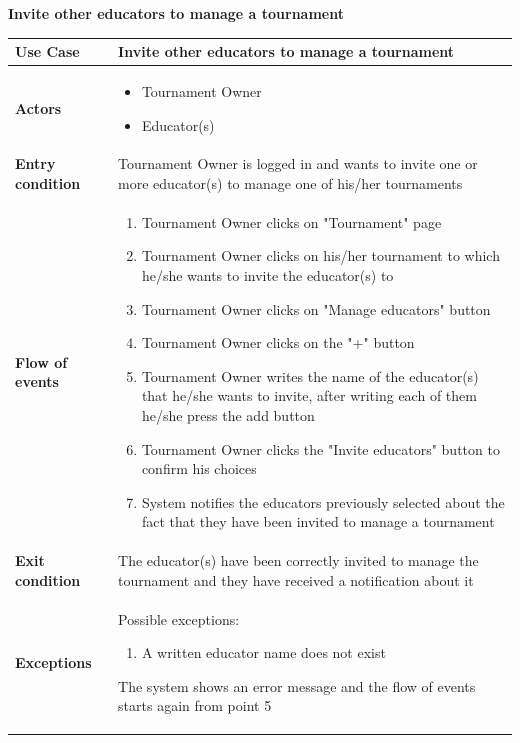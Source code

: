 \documentclass[../RASD.tex]{subfiles}
\begin{document}
        \textbf{Invite other educators to manage a tournament}\\
        \begin{table}[h!]
            \begin{center}
                \begin{tabular}{|m{10em}|m{30em}|}
                \hline
                \textbf{Use Case} & Invite other educators to manage a tournament\\
                \hline
                \textbf{Actors} & 
                    \begin{itemize}
                        \item Tournament Owner
                        \item Educator(s)
                    \end{itemize}\\
                \hline
                \textbf{Entry condition} & Tournament Owner is logged in and wants to invite one or more educator(s) to manage one of his/her tournaments\\
                \hline
                \textbf{Flow of events} & 
                \begin{enumerate}
                    \item Tournament Owner clicks on "Tournament" page
                    \item Tournament Owner clicks on his/her tournament to which he/she wants to invite the educator(s) to
                    \item Tournament Owner clicks on "Manage educators" button
                    \item Tournament Owner clicks on the "+" button
                    \item Tournament Owner writes the name of the educator(s) that he/she wants to invite, after writing each of them he/she press the add button
                    \item Tournament Owner clicks the "Invite educators" button to confirm his choices
                    \item System notifies the educators previously selected about the fact that they have been invited to manage a tournament
                \end{enumerate}\\
                \hline
                \textbf{Exit condition} & The educator(s) have been correctly invited to manage the tournament and they have received a notification about it\\
                \hline
                \textbf{Exceptions} & 
                    Possible exceptions:
                    \begin{enumerate}
                        \item A written educator name does not exist
                    \end{enumerate}
                    The system shows an error message and the flow of events starts again from point 5\\
                \hline
                \end{tabular}
            \end{center}
        \end{table}\newpage
\end{document}
